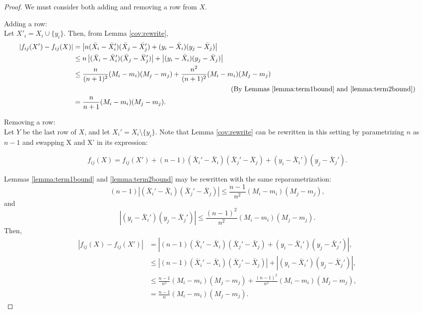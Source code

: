 \documentclass[11pt]{scrartcl} %
\begin{document}
\begin{proof}

We must consider both adding and removing a row from $X$.

Adding a row:\\
Let $X'_i = X_i \cup \{y_i\}$. Then, from Lemma \ref{cov:rewrite}, 
\begin{align}
\label{eq:addone}
\left\vert f_{ij}(X') - f_{ij}(X) \right\vert &= \left\vert n(\bar{X}_i - \bar{X}_i')(\bar{X}_j - \bar{X}_j') + (y_i - \bar{X}_i)(y_j - \bar{X}_j) \right\vert \hspace{1cm} \nonumber\\
	&\le  n \left\vert (\bar{X}_i - \bar{X}_i')(\bar{X}_j - \bar{X}_j') \right\vert + \left\vert (y_i - \bar{X}_i)(y_j - \bar{X}_j) \right\vert \nonumber\\
	&\le \frac{n}{(n+1)^2} (M_i - m_i)(M_j - m_j) + \frac{n^2}{(n+1)^2} (M_i - m_i)(M_j - m_j) \nonumber	\\
	& \hspace{8cm} \text{(By Lemmas \ref{lemma:term1bound} and \ref{lemma:term2bound})} \nonumber\\
	&= \frac{n}{n+1}  (M_i - m_i)(M_j - m_j).
\end{align}

Removing a row:\\
Let $Y$ be the last row of $X$, and let $X_i'  = X_i \setminus \{y_i\}$. Note that Lemma \ref{cov:rewrite} can be rewritten in this setting by parametrizing $n$ as $n-1$ and swapping X and X' in its expression:

$$ f_{ij}(X) = f_{ij}(X') + (n-1)(\bar{X}_i' - \bar{X}_i)(\bar{X}_j' - \bar{X}_j) + (y_i - \bar{X}_i')(y_j - \bar{X}_j'). $$

Lemmas \ref{lemma:term1bound} and \ref{lemma:term2bound} may be rewritten with the same reparametrization:
$$ (n-1)\left\vert (\bar{X}_i' - \bar{X}_i)(\bar{X}_j' - \bar{X}_j) \right\vert \le \frac{n-1}{n^2} (M_i - m_i)(M_j - m_j),$$
and 
$$ \left\vert (y_i - \bar{X}_i')(y_j - \bar{X}_j') \right\vert \le \frac{(n-1)^2}{n^2}(M_i - m_i)(M_j - m_j).$$
Then,
\begin{align}
\label{eq:subone}
\left\vert f_{ij}(X) - f_{ij}(X') \right\vert &= \left\vert (n-1)(\bar{X}_i' - \bar{X}_i)(\bar{X}_j' - \bar{X}_j) + (y_i - \bar{X}_i')(y_j - \bar{X}_j') \right\vert, \nonumber\\
	&\le  \left\vert (n-1)(\bar{X}_i' - \bar{X}_i)(\bar{X}_j' - \bar{X}_j) \right\vert + \left\vert(y_i - \bar{X}_i')(y_j - \bar{X}_j') \right\vert, \nonumber\\
	&\le \frac{n-1}{n^2} (M_i - m_i)(M_j - m_j) + \frac{(n-1)^2}{n^2}(M_i - m_i)(M_j - m_j), \nonumber\\
	&= \frac{n-1}{n} (M_i - m_i)(M_j - m_j).
\end{align}


\end{proof}
\end{document}
